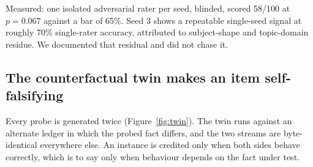\documentclass[11pt]{article}
\begin{document}
Measured: one isolated adversarial rater per seed, blinded, scored 58/100 at
$p = 0.067$ against a bar of 65\%. Seed 3 shows a repeatable single-seed
signal at roughly 70\% single-rater accuracy, attributed to subject-shape and
topic-domain residue. We documented that residual and did not chase it.

\subsection{The counterfactual twin makes an item self-falsifying}

Every probe is generated twice (Figure~\ref{fig:twin}). The twin runs against
an alternate ledger in which the probed fact differs, and the two streams are
byte-identical everywhere else. An instance is credited only when both sides
behave correctly, which is to say only when behaviour depends on the fact
under test.
\end{document}
